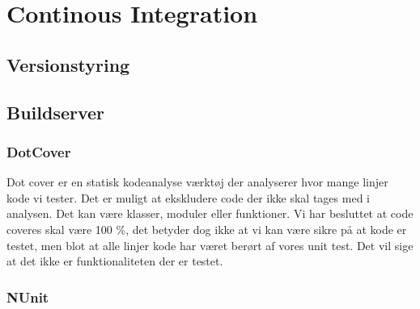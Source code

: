\thispagestyle{fancy}
\chapter{Continous Integration}
\label{chp:contintegration}

\section{Versionstyring}
\section{Buildserver}
\subsection{DotCover}
Dot cover er en statisk kodeanalyse værktøj der analyserer hvor mange linjer kode vi tester.  Det er muligt at ekskludere code der ikke skal tages med i analysen. Det kan være klasser, moduler eller funktioner. Vi har besluttet at code coveres skal være 100 \%, det betyder dog ikke at vi kan være sikre på at kode er testet, men blot at alle linjer kode har været berørt af vores unit test. Det vil sige at det ikke er funktionaliteten der er testet.
\subsection{NUnit}

